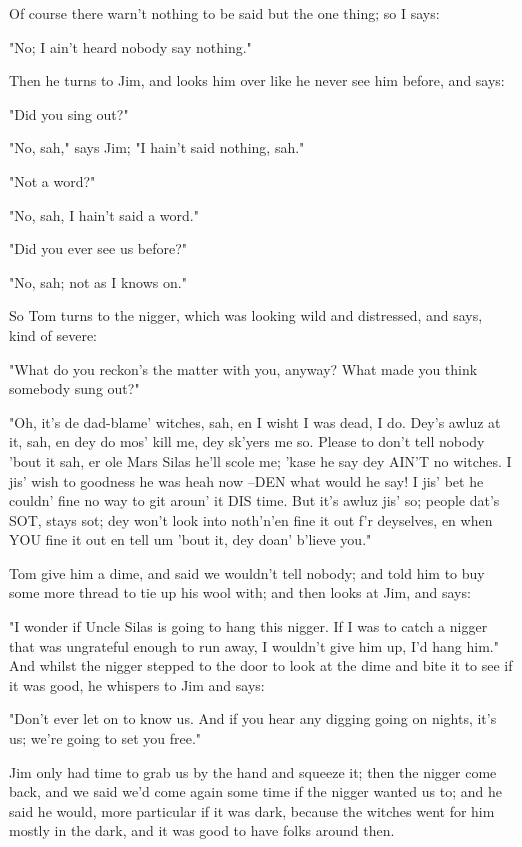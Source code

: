 Of course there warn't nothing to be said but the one thing; so I says:

"No; I ain't heard nobody say nothing."

Then he turns to Jim, and looks him over like he never see him before,
and says:

"Did you sing out?"

"No, sah," says Jim; "I hain't said nothing, sah."

"Not a word?"

"No, sah, I hain't said a word."

"Did you ever see us before?"

"No, sah; not as I knows on."

So Tom turns to the nigger, which was looking wild and distressed, and
says, kind of severe:

"What do you reckon's the matter with you, anyway?  What made you think
somebody sung out?"

"Oh, it's de dad-blame' witches, sah, en I wisht I was dead, I do.  Dey's
awluz at it, sah, en dey do mos' kill me, dey sk'yers me so.  Please to
don't tell nobody 'bout it sah, er ole Mars Silas he'll scole me; 'kase
he say dey AIN'T no witches.  I jis' wish to goodness he was heah now
--DEN what would he say!  I jis' bet he couldn' fine no way to git aroun'
it DIS time.  But it's awluz jis' so; people dat's SOT, stays sot; dey
won't look into noth'n'en fine it out f'r deyselves, en when YOU fine it
out en tell um 'bout it, dey doan' b'lieve you."

Tom give him a dime, and said we wouldn't tell nobody; and told him to
buy some more thread to tie up his wool with; and then looks at Jim, and
says:

"I wonder if Uncle Silas is going to hang this nigger.  If I was to catch
a nigger that was ungrateful enough to run away, I wouldn't give him up,
I'd hang him."  And whilst the nigger stepped to the door to look at the
dime and bite it to see if it was good, he whispers to Jim and says:

"Don't ever let on to know us.  And if you hear any digging going on
nights, it's us; we're going to set you free."

Jim only had time to grab us by the hand and squeeze it; then the nigger
come back, and we said we'd come again some time if the nigger wanted us
to; and he said he would, more particular if it was dark, because the
witches went for him mostly in the dark, and it was good to have folks
around then.




